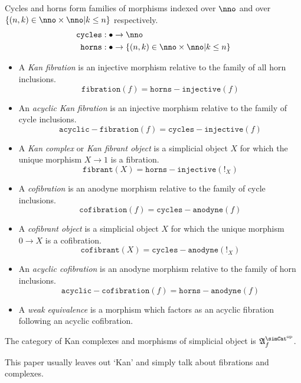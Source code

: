 \documentclass{tac}
\newcommand\hide[1]{}
\newcommand\set[1]{\left\{#1\right\}}
\newcommand\dual{^{\mathrm{op}}}
\newcommand\s{^{\simCat\dual}}
\newcommand\bang{!}
\newcommand\of{:}
\newcommand\f{_f}
\newcommand\code\mathtt
\newcommand\ambient{\mathfrak A}
\begin{document}
\begin{definition} Cycles and horns form families of morphisms indexed over $\nno$ and over $\set{(n,k)\in\nno\times\nno| k\leq n }$ respectively.
\begin{align*} 
\code{cycles}&\of\bullet\to \nno\\
 \code{horns}&\of\bullet\to\set{(n,k)\in\nno\times\nno| k\leq n }
\end{align*}
\begin{itemize}
\item A \emph{Kan fibration} is an injective morphism relative to the family of all horn inclusions.
\[ \code{fibration}(f) = \code{horns-injective}(f) \]
\item An \emph{acyclic Kan fibration} is an injective morphism relative to the family of cycle inclusions.
\[ \code{acyclic-fibration}(f) = \code{cycles-injective}(f) \]
\item A \emph{Kan complex} or \emph{Kan fibrant object} is a simplicial object $X$ for which the unique morphism $X\to 1$ is a fibration.
\[ \code{fibrant}(X) = \code{horns-injective}(\bang_X) \]

\item A \emph{cofibration} is an anodyne morphism relative to the family of cycle inclusions.%
\[ \code{cofibration}(f) = \code{cycles-anodyne}(f) \]
\item A \emph{cofibrant object} is a simplicial object $X$ for which the unique morphism $0\to X$ is a cofibration.
\[ \code{cofibrant}(X) = \code{cycles-anodyne}(\bang_X) \]
\item An \emph{acyclic cofibration} is an anodyne morphism relative to the family of horn inclusions.
\[ \code{acyclic-cofibration}(f) = \code{horns-anodyne}(f) \]
\item A \emph{weak equivalence} is a morphism which factors as an acyclic fibration following an acyclic cofibration.
\end{itemize}\label{Kan}

The category of Kan complexes and morphisms of simplicial object is $\ambient\s\f$. \hide{
In the categories we are looking at, the terminal object is projective. Therefore the internal and external concepts of having a filler operator coincide.
[I am so angry]
}
\end{definition}
This paper usually leaves out `Kan' and simply talk about fibrations and complexes. 

\hide{ no witnesses }
\end{document}
